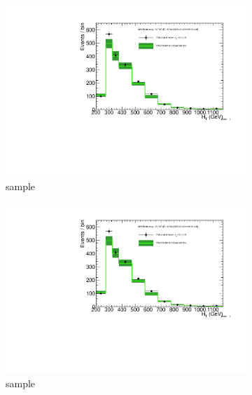 \begin{figure}[h!]
\begin{subfigure}[b]{0.48\textwidth}
    \includegraphics[width=\textwidth,page=4]
    {Figs/results/v0/greenBand/bestFit_2012dev_RQcdZero_fZinvAll_0b_ge4j-12p_smOnly}
    \caption{\mj sample}
  \end{subfigure}
  \begin{subfigure}[b]{0.48\textwidth}
    \includegraphics[width=\textwidth,page=8]
    {Figs/results/v0/greenBand/bestFit_2012dev_RQcdZero_fZinvAll_0b_ge4j-12p_smOnly}
    \caption{\mmj sample}
  \end{subfigure}\\
  \begin{subfigure}[b]{0.48\textwidth}

\end{subfigure}
\end{figure}
